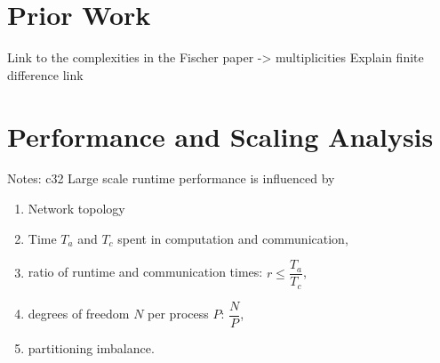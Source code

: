 \documentclass{sig-alternate}
\begin{document}





\section{Prior Work}
Link to the complexities in the Fischer paper -> multiplicities
Explain finite difference link

\section{Performance and Scaling Analysis}
\label{sec:analysis}
Notes: c32
Large scale runtime performance is influenced by 
\begin{enumerate}
  \item Network topology
  \item Time $T_a$ and $T_c$ spent in computation and communication,
  \item ratio of runtime and communication times: $r \leq \dfrac{T_a}{T_c}$,
  \item degrees of freedom $N$ per process $P$: $\dfrac{N}{P}$,
  \item partitioning imbalance.
\end{enumerate}
\end{document}
